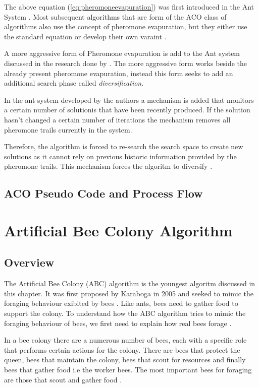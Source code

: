 The above equation (\ref{eq:pheromoneevapuration}) was first introduced in the Ant System \cite{CompuIntelligenceIntro,AntsAndStigmergy,AntIntroTrends,AntSurvey}. Most subsequent algorithms that are form of the ACO class of algorithms also use the concept of pheromone evapuration, but they either use the standard equation or develop their own varaint \cite{CompuIntelligenceIntro,AntsAndStigmergy,AntIntroTrends,AntSurvey}.

A more aggressive form of Pheromone evapuration  is add to the Ant system discussed in the research done by \cite{AntQAP}. The more aggressive form works beside the already present pheromone evapuration, instead this form seeks to add an additional search phase called \emph{diversification}. 

In the ant system developed by the authors a mechanism is added that monitors a certain number of solutionis that have been recently produced. If the solution hasn't changed a certain number of iterations the mechanism removes all pheromone trails currently in the system. 

Therefore, the algorithm is forced to re-search the search space to create new solutions as it cannot rely on previous historic information provided by the pheromone trails. This mechanism forces the algoritm to diversify \cite{AntQAP}.
\subsection{ACO Pseudo Code and Process Flow}
\section{Artificial Bee Colony Algorithm}
\label{sec:BEE}
\subsection{Overview}
The Artificial Bee Colony (ABC) algorithm is the youngest algoritm discussed in this chapter. It was first proposed by Karaboga in 2005 and seeked to mimic the foraging behaviour exibited by bees \cite{ABCCompareStudy,ABCLeafConstrained,ABCNumericalOptimization}. Like ants, bees need to gather food to support the colony. To understand how the ABC algorithm tries to mimic the foraging behaviour of bees, we first need to explain how real bees forage \cite{ABCCompareStudy}. 

In a bee colony there are a numerous number of bees, each with a specific role that performs certain actions for the colony. There are bees that protect the queen, bees that maintain the colony, bees that scout for resources and finally bees that gather food i.e the worker bees. The most important bees for foraging are those that scout and gather food \cite{ABCCompareStudy}. 

